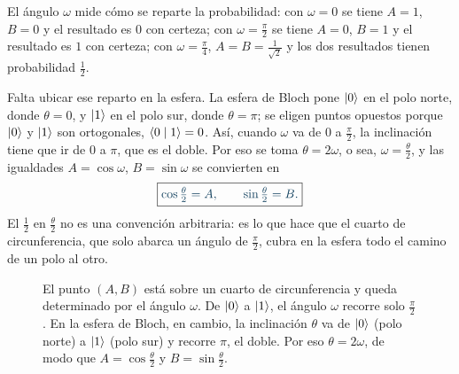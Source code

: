 El ángulo $\omega$ mide cómo se reparte la probabilidad: con $\omega=0$ se tiene $A=1$, $B=0$ y
el resultado es $0$ con certeza; con $\omega=\frac\pi2$ se tiene $A=0$, $B=1$ y el resultado es
$1$ con certeza; con $\omega=\frac\pi4$, $A=B=\frac1{\sqrt2}$ y los dos resultados tienen
probabilidad $\frac12$.

Falta ubicar ese reparto en la esfera. La esfera de Bloch pone $\lvert 0\rangle$ en el polo norte, donde
$\theta=0$, y $\lvert 1\rangle$ en el polo sur, donde $\theta=\pi$; se eligen puntos opuestos porque
$\lvert 0\rangle$ y $\lvert 1\rangle$ son ortogonales, $\langle 0\mid 1\rangle=0$. Así, cuando $\omega$ va de $0$ a $\frac\pi2$, la
inclinación tiene que ir de $0$ a $\pi$, que es el doble. Por eso se toma $\theta=2\omega$, o
sea, $\omega=\frac\theta2$, y las igualdades $A=\cos\omega$, $B=\sin\omega$ se convierten en
\begin{equation}\label{eq:theta}
  \destacado{\cos\tfrac\theta2=A,\qquad \sin\tfrac\theta2=B .}
\end{equation}
El $\frac12$ en $\frac\theta2$ no es una convención arbitraria: es lo que hace que el cuarto de
circunferencia, que solo abarca un ángulo de $\frac\pi2$, cubra en la esfera todo el camino de
un polo al otro.

\begin{figure}[H]
\centering
{}

\caption{El punto $(A,B)$ está sobre un cuarto de circunferencia y queda determinado por el ángulo $\omega$. De $\lvert 0\rangle$ a $\lvert 1\rangle$, el ángulo $\omega$ recorre solo $\frac\pi2$. En la esfera de Bloch, en cambio, la inclinación $\theta$ va de $\lvert 0\rangle$ (polo norte) a $\lvert 1\rangle$ (polo sur) y recorre $\pi$, el doble. Por eso $\theta=2\omega$, de modo que $A=\cos\frac\theta2$ y $B=\sin\frac\theta2$.}
\label{fig:theta}
\end{figure}

